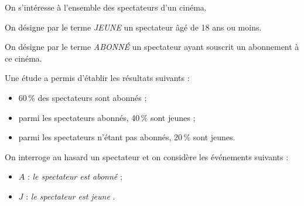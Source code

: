 On s'intéresse à l'ensemble des spectateurs d'un cinéma.

On désigne par le terme \emph{JEUNE} un spectateur âgé de 18 ans ou moins.

On désigne par le terme \emph{ABONNÉ} un spectateur ayant souscrit un abonnement à ce cinéma.

Une étude a permis d'établir les résultats suivants :

\begin{itemize}[label*=\textbullet~]
	\item 60\,\% des spectateurs sont abonnés ;
	\item parmi les spectateurs abonnés, 40\,\% sont jeunes ;
	\item parmi les spectateurs n'étant pas abonnés, 20\,\% sont jeunes.
\end{itemize}

On interroge au hasard un spectateur et on considère les événements suivants :
\begin{itemize}[label*=\textbullet~]
	\item $A$ : \og \emph{le spectateur est abonné} \fg{} ;
	\item $J$ : \og \emph{le spectateur est jeune} \fg.
\end{itemize}

